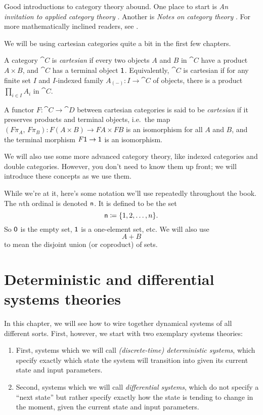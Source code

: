 \documentclass[DynamicalBook]{subfiles}
\begin{document}
Good introductions to category theory abound. One place to start is \emph{An
  invitation to applied category theory} \cite{fong2019seven}. Another is
\emph{Notes on category theory} \cite{perrone2021notes}. For more mathematically inclined readers, see \cite{Riehl:Cats.in.context}.

We will be using cartesian categories quite a bit in the first few chapters.
\begin{definition}\label{def.cartesian_category}
  A category $\cat{C}$ is \emph{cartesian} if every two objects $A$ and $B$ in
  $\cat{C}$ have a product $A \times B$, and $\cat{C}$ has a terminal object
  $\mathsf{1}$. Equivalently, $\cat{C}$ is cartesian if for any finite set $I$ and
  $I$-indexed family $A_{(-)} : I \to \cat{C}$ of objects, there is a product
  $\prod_{i \in I} A_i$ in $\cat{C}$.

  A functor $F : \cat{C} \to \cat{D}$ between cartesian categories is said to be
  \emph{cartesian} if it preserves products and terminal objects, i.e.\ the
  map $(F\pi_A,\, F\pi_B) : F(A \times B) \to FA \times FB$ is an isomorphism
  for all $A$ and $B$, and the terminal morphism $F\mathsf{1} \to \mathsf{1}$ is an
  isomorphism. 
\end{definition}

We will also use some more advanced category theory, like indexed
categories and double categories. However, you don't need to know them up front; we will introduce these concepts
as we use them.

While we're at it, here's some notation we'll use repeatedly throughout the book. The $n$th ordinal is denoted $\mathsf{n}$. It is defined to be the set
\[
\mathsf{n}\coloneqq\{1,2,\ldots,n\}.
\]
So $\mathsf{0}$ is the empty set, $\mathsf{1}$ is a one-element set, etc. We will also use
$$A + B$$
to mean the disjoint union (or coproduct) of sets.

\section{Deterministic and differential systems theories}

In this chapter, we will see how to wire together dynamical systems of all
different sorts. First, however, we start with two exemplary systems theories:

\begin{enumerate}
\item First, systems which we will call \emph{(discrete-time) deterministic
    systems}, which specify exactly which state the system will transition into
  given its current state and input parameters.
\item Second, systems which we will call \emph{differential systems}, which do
  not specify a ``next state'' but rather specify exactly how the state is
  tending to change in the moment, given the current state and input parameters.
\end{enumerate}
\end{document}
